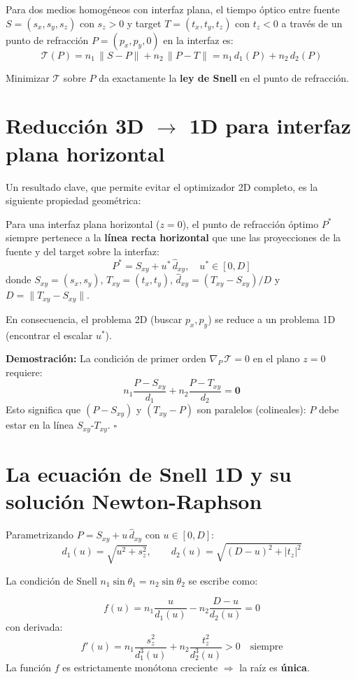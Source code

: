 \documentclass[12pt,a4paper,oneside]{book}
\newcommand{\result}[2]{%
  \begin{tcolorbox}[enhanced, breakable,
    colback=yellow!8, colframe=orange!70!black,
    fonttitle=\bfseries,
    title={\protect#1},
    attach boxed title to top left={yshift=-2mm, xshift=5mm},
    boxed title style={colback=orange!70!black}]
    #2
  \end{tcolorbox}}
\newcommand{\nuno}{n_1}
\newcommand{\ndos}{n_2}
\begin{document}
Para dos medios homogéneos con interfaz plana, el tiempo óptico entre fuente $S=(s_x,s_y,s_z)$ con $s_z>0$ y target $T=(t_x,t_y,t_z)$ con $t_z<0$ a través de un punto de refracción $P=(p_x,p_y,0)$ en la interfaz es:
\[
\mathcal{T}(P) = \nuno\,\|S-P\| + \ndos\,\|P-T\|
= \nuno\,d_1(P) + \ndos\,d_2(P)
\]

Minimizar $\mathcal{T}$ sobre $P$ da exactamente la \textbf{ley de Snell} en el punto de refracción.

\section{Reducción 3D $\rightarrow$ 1D para interfaz plana horizontal}

Un resultado clave, que permite evitar el optimizador 2D completo, es la siguiente propiedad geométrica:

\result{Reducción Dimensional de Fermat}{
Para una interfaz plana horizontal ($z=0$), el punto de refracción óptimo $P^*$ siempre pertenece
a la \textbf{línea recta horizontal} que une las proyecciones de la fuente y del target sobre
la interfaz:
\[
P^* = S_{xy} + u^*\,\hat{d}_{xy}, \quad u^* \in [0, D]
\]
donde $S_{xy}=(s_x,s_y)$, $T_{xy}=(t_x,t_y)$, $\hat{d}_{xy} = (T_{xy}-S_{xy})/D$ y $D=\|T_{xy}-S_{xy}\|$.

En consecuencia, el problema 2D (buscar $p_x,p_y$) se reduce a un problema 1D (encontrar el escalar $u^*$).
}

\textbf{Demostración:} La condición de primer orden $\nabla_P\,\mathcal{T}=0$ en el plano $z=0$ requiere:
\[
\nuno\frac{P-S_{xy}}{d_1} + \ndos\frac{P-T_{xy}}{d_2} = \mathbf{0}
\]
Esto significa que $(P-S_{xy})$ y $(T_{xy}-P)$ son paralelos (colineales): $P$ debe estar en la línea $S_{xy}$-$T_{xy}$. $\square$

\section{La ecuación de Snell 1D y su solución Newton-Raphson}

Parametrizando $P = S_{xy} + u\,\hat{d}_{xy}$ con $u\in[0,D]$:
\[
d_1(u) = \sqrt{u^2 + s_z^2}, \qquad d_2(u) = \sqrt{(D-u)^2 + |t_z|^2}
\]

La condición de Snell $\nuno\sin\theta_1 = \ndos\sin\theta_2$ se escribe como:

\result{Ecuación de Snell 1D (función raíz)}{
\[
f(u) = \nuno\frac{u}{d_1(u)} - \ndos\frac{D-u}{d_2(u)} = 0
\]
con derivada:
\[
f'(u) = \nuno\frac{s_z^2}{d_1^3(u)} + \ndos\frac{t_z^2}{d_2^3(u)} > 0 \quad \text{siempre}
\]
La función $f$ es estrictamente monótona creciente $\Rightarrow$ la raíz es \textbf{única}.
}
\end{document}
